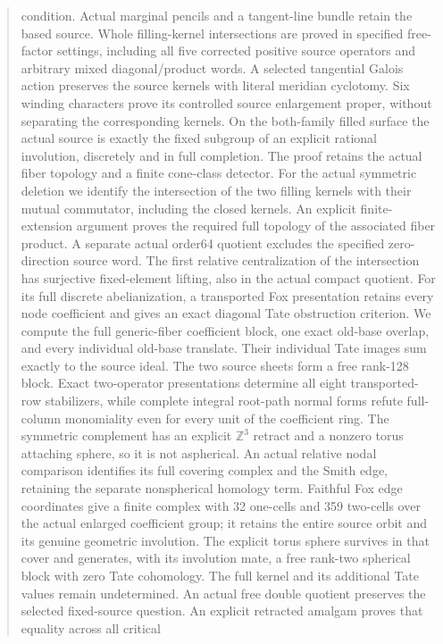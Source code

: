 \documentclass[11pt,a4paper]{article}
\begin{document}
\begin{abstract}
condition. Actual marginal pencils and a tangent-line bundle retain
the based source. Whole filling-kernel intersections are proved in
specified free-factor settings, including all five corrected positive
source operators and arbitrary mixed diagonal/product words. A selected
tangential Galois action preserves the source kernels with literal
meridian cyclotomy. Six winding characters prove its controlled source
enlargement proper, without separating the corresponding kernels.
On the both-family filled surface the actual source is exactly the
fixed subgroup of an explicit rational involution, discretely and in
full completion. The proof retains the actual fiber topology and a
finite cone-class detector. For the actual symmetric deletion we
identify the intersection of the two filling kernels with their mutual
commutator, including the closed kernels. An explicit finite-extension
argument proves the required full topology of the associated fiber
product. A separate actual order64 quotient excludes the specified
zero-direction source word. The first relative centralization of the
intersection has surjective fixed-element lifting, also in the actual
compact quotient. For its full discrete abelianization, a transported
Fox presentation retains every node coefficient and gives an exact
diagonal Tate obstruction criterion. We compute the full generic-fiber
coefficient block, one exact old-base overlap, and every individual
old-base translate. Their individual Tate images sum exactly to the
source ideal. The two source sheets form a free rank-128 block.
Exact two-operator presentations determine all eight transported-row
stabilizers, while complete integral root-path normal forms refute
full-column monomiality even for every unit of the coefficient ring.
The symmetric complement has an explicit $\mathbb Z^3$ retract and a
nonzero torus attaching sphere, so it is not aspherical. An actual
relative nodal comparison identifies its full covering complex and the
Smith edge, retaining the separate nonspherical homology term. Faithful
Fox edge coordinates give a finite complex with 32 one-cells and 359
two-cells over the actual enlarged coefficient group; it retains the
entire source orbit and its genuine geometric involution. The explicit
torus sphere survives in that cover and generates, with its involution
mate, a free rank-two spherical block with zero Tate cohomology. The
full kernel and its additional Tate values remain undetermined. An actual
free double quotient preserves the selected fixed-source question.
An explicit retracted amalgam proves that equality across all critical

\end{abstract}
\end{document}

